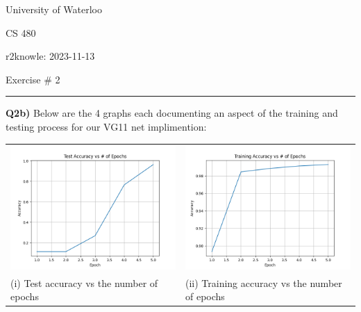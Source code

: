 \documentclass{article}
\begin{document}
\begin{titlepage}
	\setlength{\parindent}{0pt}
	\large

\vspace*{-2cm}



University of Waterloo \par
CS 480 \par
\vspace{0.05cm}
r2knowle: 2023-11-13
\vspace{0.2cm}

{\huge Exercise \# 2 \par}
\hrule

\vspace{0.5cm}
\textbf{Q2b)} Below are the 4 graphs each documenting an aspect of the training and testing process for our VG11 net implimention:

\begin{tabular}{ll}

 \includegraphics[width=.5\linewidth]{testA.png} &  \includegraphics[width=.5\linewidth]{trainA.png}\\
 \hfil (i) Test accuracy vs the number of epochs \hfil & \hfil (ii) Training accuracy vs the number of epochs \hfil \\
 

\end{tabular}
\end{titlepage}
\end{document}
